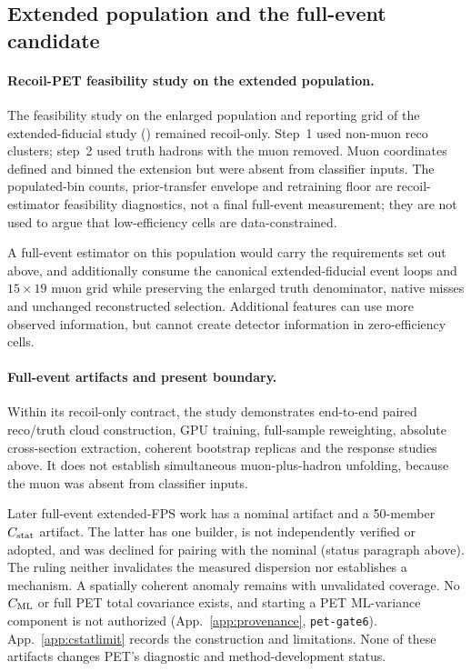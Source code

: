 \subsection{Extended population and the full-event candidate}
\label{sec:pet-full-event-status}

\paragraph{Recoil-PET feasibility study on the extended population.}
\label{sec:fps-pet}
The feasibility study on the enlarged population and reporting grid of the extended-fiducial study () remained recoil-only. Step~1 used non-muon reco clusters; step~2 used truth hadrons with the muon removed. Muon coordinates defined and binned the extension but were absent from classifier inputs. The populated-bin counts, prior-transfer envelope and retraining floor are recoil-estimator feasibility diagnostics, not a final full-event measurement; they are not used to argue that low-efficiency cells are data-constrained.

A full-event estimator on this population would carry the requirements set out above, and additionally consume the canonical extended-fiducial event loops and $15\times19$ muon grid while preserving the enlarged truth denominator, native misses and unchanged reconstructed selection. Additional features can use more observed information, but cannot create detector information in zero-efficiency cells.

\paragraph{Full-event artifacts and present boundary.} Within its recoil-only contract, the study demonstrates end-to-end paired reco/truth cloud construction, GPU training, full-sample reweighting, absolute cross-section extraction, coherent bootstrap replicas and the response studies above. It does not establish simultaneous muon-plus-hadron unfolding, because the muon was absent from classifier inputs.

Later full-event extended-FPS work has a nominal artifact and a 50-member $C_{\rm stat}$ artifact. The latter has one builder, is not independently verified or adopted, and was declined for pairing with the nominal (status paragraph above). The ruling neither invalidates the measured dispersion nor establishes a mechanism. A spatially coherent anomaly remains with unvalidated coverage. No $C_{\rm ML}$ or full PET total covariance exists, and starting a PET ML-variance component is not authorized (App.~\ref{app:provenance}, \texttt{pet-gate6}). App.~\ref{app:cstatlimit} records the construction and limitations. None of these artifacts changes PET's diagnostic and method-development status.

